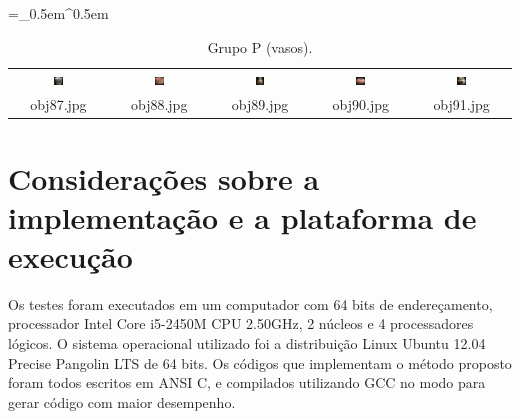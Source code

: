 \begin{table}[H]
  \centering
  \caption{Grupo P (vasos).}
  \tabulinesep =_0.5em^0.5em
  \everyrow{\tabucline[0.4pt]-}
  \begin{tabu}{|ccccc|}
    \includegraphics[width=0.1\textwidth,height=0.1\textwidth]{imagens/coil_100/vasos/obj18__0.png} &
    \includegraphics[width=0.1\textwidth,height=0.1\textwidth]{imagens/coil_100/vasos/obj25__0.png} &
    \includegraphics[width=0.1\textwidth,height=0.1\textwidth]{imagens/coil_100/vasos/obj30__0.png} &
    \includegraphics[width=0.1\textwidth,height=0.1\textwidth]{imagens/coil_100/vasos/obj56__0.png} &
    \includegraphics[width=0.1\textwidth,height=0.1\textwidth]{imagens/coil_100/vasos/obj58__0.png}
    \\
    \scriptsize{obj87.jpg} & \scriptsize{obj88.jpg} & \scriptsize{obj89.jpg} &
    \scriptsize{obj90.jpg} & \scriptsize{obj91.jpg}
  \end{tabu}
\end{table}

\section{Considerações sobre a implementação e a plataforma de execução}

Os testes foram executados em um computador com 64 bits de endereçamento,
processador Intel Core i5-2450M CPU 2.50GHz, 2 núcleos e 4 processadores
lógicos. O sistema operacional utilizado foi a distribuição Linux Ubuntu 12.04
Precise Pangolin LTS de 64 bits. Os códigos que implementam o método proposto
foram todos escritos em ANSI C, e compilados utilizando GCC no modo para gerar
código com maior desempenho.


